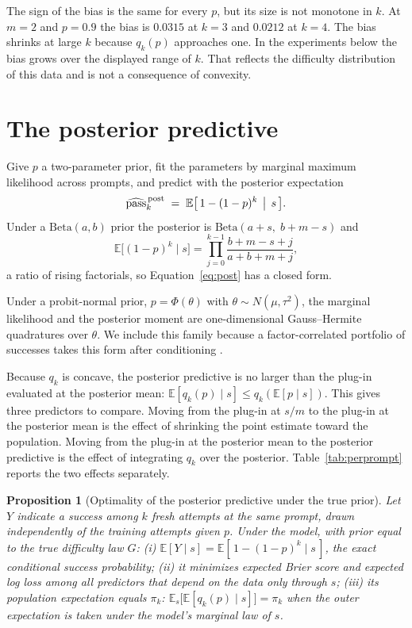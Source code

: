 \documentclass[11pt]{article}
\theoremstyle{itheads}
\newtheorem{proposition}{Proposition}
\begin{document}
The sign of the bias is the same for every $p$, but its size is not
monotone in $k$. At $m=2$ and $p=0.9$ the bias is $0.0315$ at $k=3$
and $0.0212$ at $k=4$. The bias shrinks at large $k$ because
$q_k(p)$ approaches one. In the experiments below the bias grows
over the displayed range of $k$. That reflects the difficulty
distribution of this data and is not a consequence of convexity.

\section{The posterior predictive}

Give $p$ a two-parameter prior, fit the parameters by marginal
maximum likelihood across prompts, and predict with the posterior
expectation
\begin{equation}
\widehat{\mathrm{pass}}_k^{\,\mathrm{post}}
\;=\; \mathbb{E}\bigl[\,1-(1-p)^k \,\bigm|\, s\,\bigr].
\label{eq:post}
\end{equation}
Under a $\mathrm{Beta}(a,b)$ prior the posterior is
$\mathrm{Beta}(a+s,\; b+m-s)$ and
\begin{equation}
\mathbb{E}\bigl[(1-p)^k \mid s\bigr]
= \prod_{j=0}^{k-1} \frac{b+m-s+j}{a+b+m+j},
\label{eq:rising}
\end{equation}
a ratio of rising factorials, so Equation~\eqref{eq:post} has a
closed form.

Under a probit-normal prior, $p = \Phi(\theta)$ with
$\theta \sim N(\mu, \tau^2)$, the marginal likelihood and the
posterior moment are one-dimensional Gauss--Hermite quadratures over
$\theta$. We include this family because a factor-correlated
portfolio of successes takes this form after conditioning
\citep{cotton2026}.

Because $q_k$ is concave, the posterior predictive is no larger than
the plug-in evaluated at the posterior mean:
$\mathbb{E}[q_k(p) \mid s] \le q_k(\mathbb{E}[p \mid s])$. This
gives three predictors to compare. Moving from the plug-in at $s/m$
to the plug-in at the posterior mean is the effect of shrinking the
point estimate toward the population. Moving from the plug-in at the
posterior mean to the posterior predictive is the effect of
integrating $q_k$ over the posterior. Table~\ref{tab:perprompt}
reports the two effects separately.

\begin{proposition}[Optimality of the posterior predictive under
the true prior]
\label{prop:bayes}
Let $Y$ indicate a success among $k$ fresh attempts at the same
prompt, drawn independently of the training attempts given $p$.
Under the model, with prior equal to the true difficulty law $G$:
(i) $\mathbb{E}[Y \mid s] =
\mathbb{E}[\,1-(1-p)^k \mid s\,]$, the exact conditional success
probability; (ii) it minimizes expected Brier score and expected log
loss among all predictors that depend on the data only through $s$;
(iii) its population expectation equals $\pi_k$:
$\mathbb{E}_{s}\bigl[\mathbb{E}[q_k(p) \mid s]\bigr] = \pi_k$ when
the outer expectation is taken under the model's marginal law of
$s$.
\end{proposition}
\end{document}
